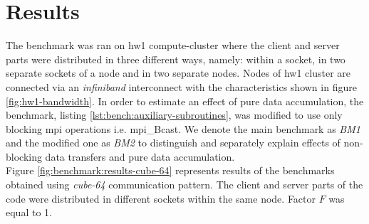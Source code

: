 \section{Results}
\label{sec:accumulator-results}


The benchmark was ran on \gls{hw1} compute-cluster where the client and server parts were distributed in three different ways, namely: within a socket, in two separate sockets of a node and in two separate nodes. Nodes of \gls{hw1} cluster are connected via an  \textit{infiniband} interconnect with the characteristics shown in figure \ref{fig:hw1-bandwidth}. In order to estimate an effect of pure data accumulation, the benchmark, listing \ref{lst:bench:auxiliary-subroutines}, was modified to use only blocking \acrshort{mpi} operations i.e. \acrshort{mpi}\_Bcast. We denote the main benchmark as \textit{BM1} and the modified one as \textit{BM2} to distinguish and separately explain effects of non-blocking data transfers and pure data accumulation.\\


Figure \ref{fig:benchmark:results-cube-64} represents results of the benchmarks obtained using \textit{cube-64} communication pattern. The client and server parts of the code were distributed in different sockets within the same node. Factor $F$ was  equal to 1.\\


